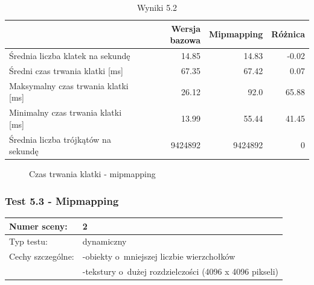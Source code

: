 \documentclass[a4paper,twoside,12pt]{book}
\begin{document}
\vbox{}

\begin{table}[H]
    \centering
    \caption{Wyniki 5.2}
    \label{tab:mip_test2}
    \begin{tabular}{|l||r|r|r|}
        \hline
        & Wersja bazowa & Mipmapping & Różnica \\
        \hline
        Średnia liczba klatek na sekundę & 14.85 & 14.83 & -0.02 \\
        \hline
        Średni czas trwania klatki [ms] & 67.35 & 67.42 & 0.07 \\
        \hline
        Maksymalny czas trwania klatki [ms] & 26.12 & 92.0 & 65.88 \\
        \hline
        Minimalny czas trwania klatki [ms] & 13.99 & 55.44 & 41.45 \\
        \hline
        Średnia liczba trójkątów na sekundę & 9424892 & 9424892 & 0 \\
        \hline
    \end{tabular}
\end{table}

\vbox{}

\begin{figure}[H]
\centering
{}

\caption{Czas trwania klatki - mipmapping}
\label{fig:dynamic_plot_mip2_met}
\end{figure}

\newpage

\subsubsection{Test 5.3 - Mipmapping}
\begin{tabular}{|l||l|}
\hline
Numer sceny: & 2 \\
\hline
Typ testu: & dynamiczny \\
\hline
Cechy szczególne: & -obiekty o~mniejszej liczbie wierzchołków \\
& -tekstury o~dużej rozdzielczości (4096 x 4096 pikseli) \\
\hline
\end{tabular}\\
\end{document}
